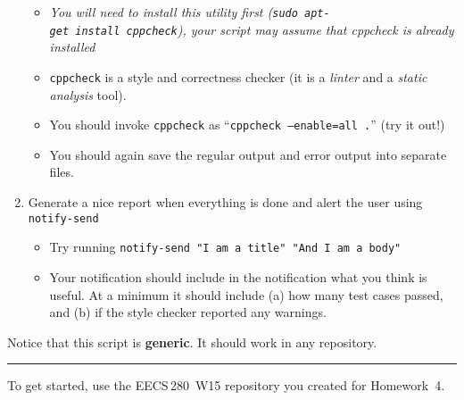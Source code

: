 \documentclass{article}
\begin{document}
\begin{enumerate}
    \begin{itemize}
      \item \emph{\small You will need to install this utility first
        (\texttt{sudo~apt-get~install~cppcheck}), your script may assume that
        cppcheck is already installed}
      \item \texttt{cppcheck} is a style and correctness checker (it is a
        \emph{linter} and a \emph{static analysis} tool).
      \item You should invoke \texttt{cppcheck} as
        ``\texttt{cppcheck~--enable=all~.}'' (try it out!)
      \item You should again save the regular output and error output into
        separate files.
    \end{itemize}
\item Generate a nice report when everything is done and alert the user
    using \texttt{notify-send}
        \begin{itemize}
            \item Try running \texttt{notify-send "I am a title" "And I am a body"}
            \item Your notification should include in the notification what you
                think is useful. At a minimum it should include (a) how many test
                cases passed, and (b) if the style checker reported any warnings.
        \end{itemize}
\end{enumerate}

\medskip
\noindent
Notice that this script is \textbf{generic}. It should work in any repository.

\bigskip
\hrule
\bigskip

\medskip
\noindent
To get started, use the EECS\,280~W15 repository you created for Homework~4.
\end{document}
